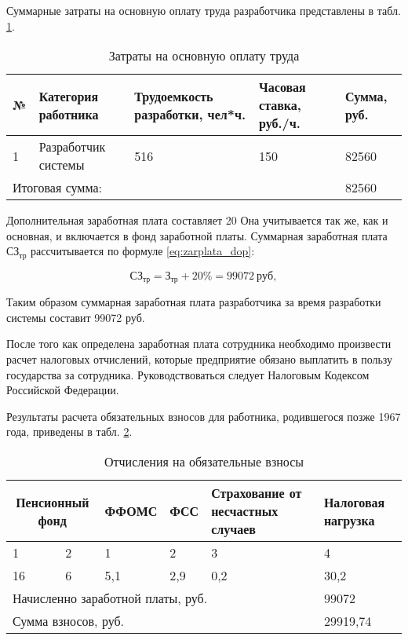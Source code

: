 Суммарные затраты на основную оплату труда разработчика представлены в табл. \ref{tab:zarplata}.

\begin{footnotesize}
\begin{longtable}[h]{|p{}|p{}|p{}|p{}|p{}|}
	\caption{\label{tab:zarplata}Затраты на основную оплату труда} \\
	\hline
		\textbf{№} &
		\textbf{Категория работника} &
		\textbf{Трудоемкость разработки, чел*ч.} &
		\textbf{Часовая ставка, руб./ч.} &
		\textbf{Сумма, руб.} \\
	\hline
		1 & Разработчик системы & 516 & 150 & 82560 \\ \hline
		\multicolumn{4}{|l|}{Итоговая сумма:} & 82560 \\ \hline
\end{longtable}
\end{footnotesize}

Дополнительная заработная плата составляет 20%
Она учитывается так же, как и основная, и включается в фонд заработной платы.
Суммарная заработная плата $СЗ_{тр}$ рассчитывается по формуле \ref{eq:zarplata_dop}: 

\begin{equation}
	\label{eq:zarplata_dop}
	СЗ_{тр} = З_{тр} + 20\% = 99072~руб,
\end{equation}

Таким образом суммарная заработная плата разработчика за время разработки системы составит 99072 руб. 

После того как определена заработная плата сотрудника необходимо произвести расчет налоговых отчислений, которые предприятие обязано выплатить в пользу государства за сотрудника.
Руководствоваться следует Налоговым Кодексом Российской Федерации.

Результаты расчета обязательных взносов для работника, родившегося позже 1967 года, приведены в табл. \ref{tab:zarplata_nalog}.

\begin{footnotesize}
\begin{longtable}[h]{|p{}|p{}|p{}|p{}|p{}|p{}|}
	\caption{\label{tab:zarplata_nalog}Отчисления на обязательные взносы} \\
	\hline
		\multicolumn{2}{|c|}{\textbf{Пенсионный фонд}} &
		\multirow{2}{*}{\textbf{ФФОМС}} &
		\multirow{2}{*}{\textbf{ФСС}} &
		\multirow{2}{*}{\textbf{Страхование от несчастных случаев}} &
		\multirow{2}{*}{\textbf{Налоговая нагрузка}} \\
	\hline
		1 & 2 & 1 & 2 & 3 & 4 \\
	\hline
		16 & 6 & 5,1 & 2,9 & 0,2 & 30,2 \\ \hline
		\multicolumn{5}{|l|}{Начисленно заработной платы, руб.} & 99072 \\ \hline
		\multicolumn{5}{|l|}{Сумма взносов, руб.} & 29919,74 \\ \hline
\end{longtable}
\end{footnotesize}

